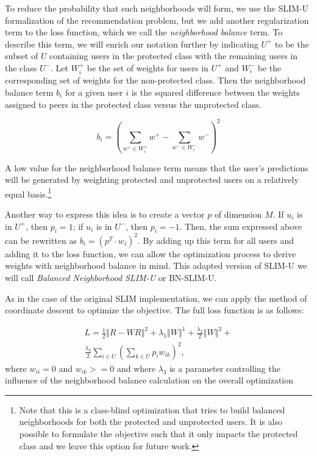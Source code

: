 To reduce the probability that such neighborhoods will form, we use the SLIM-U formalization of the recommendation problem, but we add another regularization term to the loss function, which we call the \textit{neighborhood balance} term. To describe this term, we will enrich our notation further by indicating $U^+$ to be the subset of $U$ containing users in the protected class with the remaining users in the class $U^-$. Let $W_i^+$ be the set of weights for users in $U^+$ and $W_i^-$ be the corresponding set of weights for the non-protected class. Then the neighborhood balance term $b_i$ for a given user $i$ is the squared difference between the weights assigned to peers in the protected class versus the unprotected class.

\begin{equation}
    b_i = (\sum_{w^+ \in W_i^+}{w^+} - \sum_{w^- \in W_i^-}{w^-})^2
\end{equation}

A low value for the neighborhood balance term means that the user's predictions will be generated by weighting protected and unprotected users on a relatively equal basis.\footnote{Note that this is a class-blind optimization that tries to build balanced neighborhoods for both the protected and unprotected users. It is also possible to formulate the objective such that it only impacts the protected class and we leave this option for future work.}

Another way to express this idea is to create a vector $p$ of dimension $M$. If $u_i$ is in $U^+$, then $p_i = 1$; if $u_i$ is in $U^-$, then $p_i = -1$. Then, the sum expressed above can be rewritten as $b_i = (p^T \cdot w_i)^2$. By adding up this term for all users and adding it to the loss function, we can allow the optimization process to derive weights with neighborhood balance in mind. This adapted version of SLIM-U we will call \textit{Balanced Neighborhood SLIM-U} or BN-SLIM-U.

As in the case of the original SLIM implementation, we can apply the method of coordinate descent to optimize the objective. The full loss function is as follows:

\begin{equation}
\begin{split}
 L = \frac{1}{2}\left\Vert R - WR \right\Vert^2 + 
    \lambda_1 \left\Vert W \right\Vert^1 + 
    \frac{\lambda_2}{2}\left\Vert W \right\Vert^2 + \\
    \frac{\lambda_3}{2}\sum_{i \in U}\left(\sum_{k \in U}p_iw_{ik}\right)^2,
\end{split}
\end{equation}
where $w_{ii}=0$ and $w_{ik}>=0$ and where $\lambda_3$ is a parameter controlling the influence of the neighborhood balance calculation on the overall optimization

